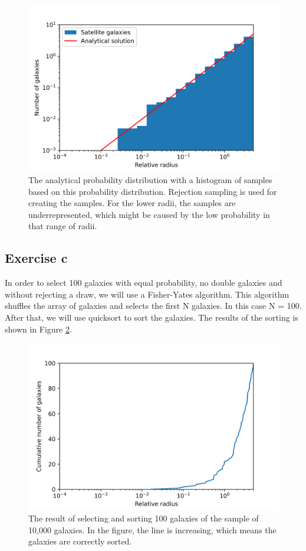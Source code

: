 \begin{figure}[h!]
  \centering
  \includegraphics[width=0.9\linewidth]{my_solution_1b.png}
  \caption{The analytical probability distribution with a histogram of samples based on this probability distribution. Rejection sampling is used for creating the samples. For the lower radii, the samples are underrepresented, which might be caused by the low probability in that range of radii.}
  \label{fig:1b}
\end{figure}

\subsection{Exercise c}
In order to select 100 galaxies with equal probability, no double galaxies and without rejecting a draw, we will use a Fisher-Yates algorithm. This algorithm shuffles the array of galaxies and selects the first N galaxies. In this case N = 100. After that, we will use quicksort to sort the galaxies. The results of the sorting is shown in Figure \ref{fig:1c}.

\begin{figure}[h!]
  \centering
  \includegraphics[width=0.9\linewidth]{my_solution_1c.png}
  \caption{The result of selecting and sorting 100 galaxies of the sample of 10,000 galaxies. In the figure, the line is increasing, which means the galaxies are correctly sorted.}
  \label{fig:1c}
\end{figure}

